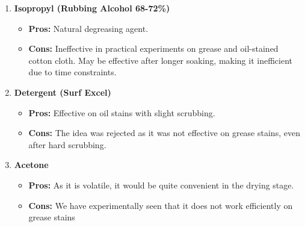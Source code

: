 \documentclass[table]{rapportCS}
\begin{document}
\begin{enumerate}
    \item \textbf{Isopropyl (Rubbing Alcohol 68-72\%)}
    \begin{itemize}[label=$\bullet$]
        \item \textbf{Pros:} Natural degreasing agent.
        \item \textbf{Cons:} Ineffective in practical experiments on grease and oil-stained cotton cloth. May be effective after longer soaking, making it inefficient due to time constraints.
    \end{itemize}
    \item \textbf{Detergent (Surf Excel)}
    \begin{itemize}[label=$\bullet$]
        \item \textbf{Pros:} Effective on oil stains with slight scrubbing.
        \item \textbf{Cons:} The idea was rejected as it was not effective on grease stains, even after hard scrubbing.
    \end{itemize}
    \item \textbf{Acetone}
    \begin{itemize}[label=$\bullet$]
        \item \textbf{Pros:} As it is volatile, it would be quite convenient in the drying stage.

        \item \textbf{Cons:} We have experimentally seen that it does not work efficiently on grease stains

    \end{itemize}
\end{enumerate}
\end{document}
